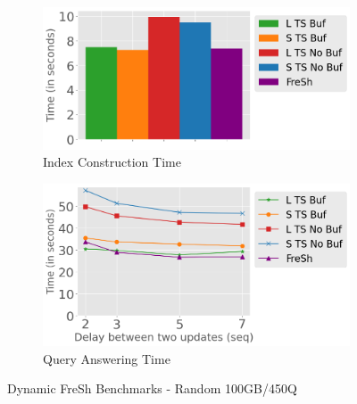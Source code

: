\begin{figure}
	\centering
	\begin{subfigure}[c]{0.48\textwidth}
		\includegraphics[width=1\textwidth]   {figures/Experiments/Dynamic/Delays/index_construction_all.png}
		\caption{Index Construction Time}
		\label{fig:actual-index-Construction-time}
	\end{subfigure}
	\begin{subfigure}[c]{0.48\textwidth}
		\includegraphics[width=1\textwidth]   {figures/Experiments/Dynamic/Delays/qa_delay_x_axis.png}
		\caption{Query Answering Time}
		\label{fig:actual-query-answering-time}
	\end{subfigure}
	\caption{Dynamic FreSh Benchmarks - Random 100GB/450Q}
	\label{fig:dfresh-fresh-random}
\end{figure}


